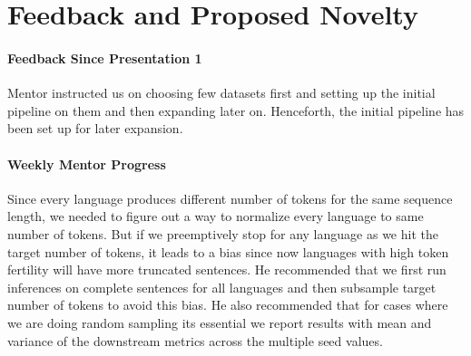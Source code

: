 \section{Feedback and Proposed Novelty}
\label{sec:app1_feedback_novelty}


\paragraph{Feedback Since Presentation 1}
Mentor instructed us on choosing few datasets first and setting up the initial pipeline on them and then expanding later on. Henceforth, the initial pipeline has been set up for later expansion.

\paragraph{Weekly Mentor Progress}
Since every language produces different number of tokens for the same sequence length, we needed to figure out a way to normalize every language to same number of tokens. But if we preemptively stop for any language as we hit the target number of tokens, it leads to a bias since now languages with high token fertility will have more truncated sentences. He recommended that we first run inferences on complete sentences for all languages and then subsample target number of tokens to avoid this bias. He also recommended that for cases where we are doing random sampling its essential we report results with mean and variance of the downstream metrics across the multiple seed values.